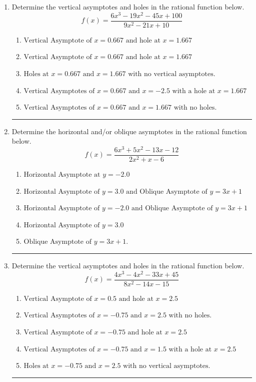 \documentclass[14pt]{extbook}
\newcommand{\litem}[1]{\item#1\hspace*{-1cm}\rule{\textwidth}{0.4pt}}
\begin{document}
\begin{enumerate}
{\begin{enumerate}[label=\Alph*.]
\end{enumerate} }
\litem{
Determine the vertical asymptotes and holes in the rational function below.\[ f(x) = \frac{6x^{3} -19 x^{2} -45 x + 100}{9x^{2} -21 x + 10} \]\begin{enumerate}[label=\Alph*.]
\item \( \text{Vertical Asymptote of } x = 0.667 \text{ and hole at } x = 1.667 \)
\item \( \text{Vertical Asymptote of } x = 0.667 \text{ and hole at } x = 1.667 \)
\item \( \text{Holes at } x = 0.667 \text{ and } x = 1.667 \text{ with no vertical asymptotes.} \)
\item \( \text{Vertical Asymptotes of } x = 0.667 \text{ and } x = -2.5 \text{ with a hole at } x = 1.667 \)
\item \( \text{Vertical Asymptotes of } x = 0.667 \text{ and } x = 1.667 \text{ with no holes.} \)

\end{enumerate} }
\litem{
Determine the horizontal and/or oblique asymptotes in the rational function below.\[ f(x) = \frac{6x^{3} +5 x^{2} -13 x -12}{2x^{2} +x -6} \]\begin{enumerate}[label=\Alph*.]
\item \( \text{Horizontal Asymptote at } y = -2.0 \)
\item \( \text{Horizontal Asymptote of } y = 3.0 \text{ and Oblique Asymptote of } y = 3x + 1 \)
\item \( \text{Horizontal Asymptote of } y = -2.0 \text{ and Oblique Asymptote of } y = 3x + 1 \)
\item \( \text{Horizontal Asymptote of } y = 3.0  \)
\item \( \text{Oblique Asymptote of } y = 3x + 1. \)

\end{enumerate} }
\litem{
Determine the vertical asymptotes and holes in the rational function below.\[ f(x) = \frac{4x^{3} -4 x^{2} -33 x + 45}{8x^{2} -14 x -15} \]\begin{enumerate}[label=\Alph*.]
\item \( \text{Vertical Asymptote of } x = 0.5 \text{ and hole at } x = 2.5 \)
\item \( \text{Vertical Asymptotes of } x = -0.75 \text{ and } x = 2.5 \text{ with no holes.} \)
\item \( \text{Vertical Asymptote of } x = -0.75 \text{ and hole at } x = 2.5 \)
\item \( \text{Vertical Asymptotes of } x = -0.75 \text{ and } x = 1.5 \text{ with a hole at } x = 2.5 \)
\item \( \text{Holes at } x = -0.75 \text{ and } x = 2.5 \text{ with no vertical asymptotes.} \)


\end{enumerate}}
\end{enumerate}
\end{document}
